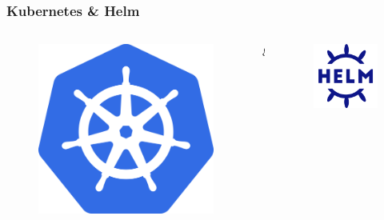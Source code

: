 \documentclass{beamer}
\begin{document}
\begin{frame}
    \frametitle{Kubernetes \& Helm}
    \begin{columns}
        \begin{column}{0.45\textwidth}
            \begin{figure}
                \includegraphics[scale=0.15]{figuras/kubernetes-logo}
            \end{figure}
        \end{column}
        \begin{column}{0.1\textwidth}
            \center
            \LARGE \&
        \end{column}
        \begin{column}{0.45\textwidth}
            \begin{figure}
                \includegraphics[scale=0.18]{figuras/helm-logo}

\end{figure}
\end{column}
\end{columns}
\end{frame}
\end{document}
